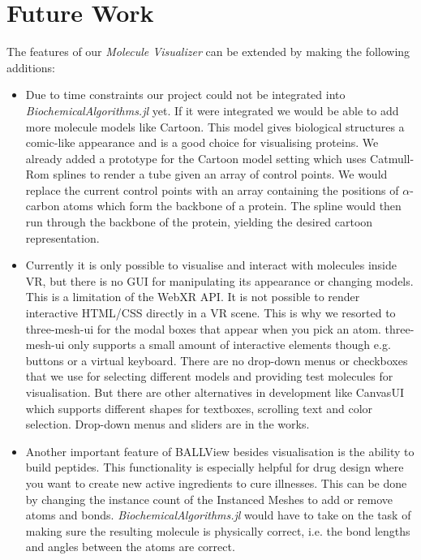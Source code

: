 \section{Future Work}
\label{sec:conclusion:future}

The features of our \textit{Molecule Visualizer} can be extended by making the following additions:
\begin{itemize}
\item Due to time constraints our project could not be integrated into \textit{BiochemicalAlgorithms.jl} yet. If it were integrated we would be able to add more molecule models like Cartoon. This model gives biological structures a comic-like appearance and is a good choice for visualising proteins. We already added a prototype for the Cartoon model setting which uses Catmull-Rom splines to render a tube given an array of control points. We would replace the current control points with an array containing the positions of $\alpha$-carbon atoms which form the backbone of a protein. The spline would then run through the backbone of the protein, yielding the desired cartoon representation.
\item Currently it is only possible to visualise and interact with molecules inside VR, but there is no GUI for manipulating its appearance or changing models. This is a limitation of the WebXR API. It is not possible to render interactive HTML/CSS directly in a VR scene. This is why we resorted to three-mesh-ui for the modal boxes that appear when you pick an atom. three-mesh-ui only supports a small amount of interactive elements though e.g. buttons or a virtual keyboard. There are no drop-down menus or checkboxes that we use for selecting different models and providing test molecules for visualisation. But there are other alternatives in development like CanvasUI which supports different shapes for textboxes, scrolling text and color selection. Drop-down menus and sliders are in the works. 
\item Another important feature of BALLView besides visualisation is the ability to build peptides. This functionality is especially helpful for drug design where you want to create new active ingredients to cure illnesses. This can be done by changing the instance count of the Instanced Meshes to add or remove atoms and bonds. \textit{BiochemicalAlgorithms.jl} would have to take on the task of making sure the resulting molecule is physically correct, i.e. the bond lengths and angles between the atoms are correct.
\end{itemize}